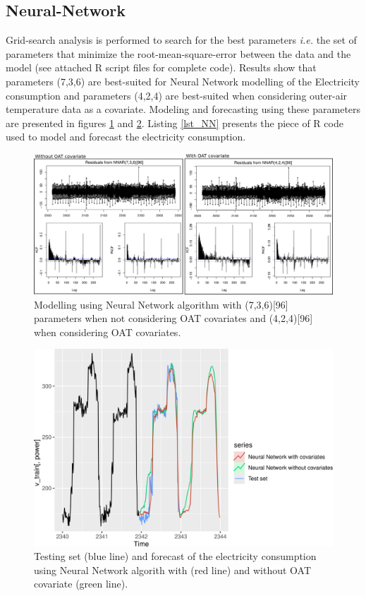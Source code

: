 \subsection{Neural-Network}
Grid-search analysis is performed to search for the best parameters \textit{i.e.} the set of 
parameters that minimize the root-mean-square-error between the data and the model (see attached R 
script files for complete code). Results show that parameters (7,3,6) are best-suited for Neural 
Network modelling of the Electricity consumption and parameters (4,2,4) are best-suited when 
considering outer-air temperature data as a covariate. Modeling and forecasting using these 
parameters are presented in figures \ref{figure_residuals_NN} and \ref{figure_fit_NN}. Listing 
\ref{lst_NN} presents the piece of R code used to model and forecast the electricity consumption. 

\begin{figure}[H]
\centering
 \includegraphics[scale=0.35]{figures/figure_residuals_NN.png}
 \caption{Modelling using Neural Network algorithm with (7,3,6)[96] parameters when not considering OAT covariates and (4,2,4)[96] when considering OAT covariates.}
 \label{figure_residuals_NN}
\end{figure}

\begin{figure}[H]
\centering
 \includegraphics[scale=0.55]{figures/figure_fit_NN.png}
\caption{Testing set (blue line) and forecast of the electricity consumption using Neural Network algorith with (red line) and without OAT covariate (green line).}
\label{figure_fit_NN}
\end{figure}

